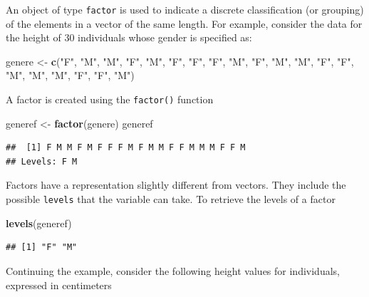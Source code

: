 \documentclass[
]{article}
\newenvironment{Shaded}{\begin{snugshade}}{\end{snugshade}}
\newcommand{\FunctionTok}[1]{\textcolor[rgb]{0.13,0.29,0.53}{\textbf{#1}}}
\newcommand{\NormalTok}[1]{#1}
\newcommand{\OtherTok}[1]{\textcolor[rgb]{0.56,0.35,0.01}{#1}}
\newcommand{\StringTok}[1]{\textcolor[rgb]{0.31,0.60,0.02}{#1}}
\begin{document}
An object of type \texttt{factor} is used to indicate a discrete
classification (or grouping) of the elements in a vector of the same
length. For example, consider the data for the height of 30 individuals
whose gender is specified as:

\begin{Shaded}
\begin{Highlighting}[]
\NormalTok{genere }\OtherTok{\textless{}{-}} \FunctionTok{c}\NormalTok{(}\StringTok{"F"}\NormalTok{, }\StringTok{"M"}\NormalTok{, }\StringTok{"M"}\NormalTok{, }\StringTok{"F"}\NormalTok{, }\StringTok{"M"}\NormalTok{, }\StringTok{"F"}\NormalTok{, }\StringTok{"F"}\NormalTok{, }\StringTok{"F"}\NormalTok{, }\StringTok{"M"}\NormalTok{, }\StringTok{"F"}\NormalTok{, }
            \StringTok{"M"}\NormalTok{, }\StringTok{"M"}\NormalTok{, }\StringTok{"F"}\NormalTok{, }\StringTok{"F"}\NormalTok{, }\StringTok{"M"}\NormalTok{, }\StringTok{"M"}\NormalTok{, }\StringTok{"M"}\NormalTok{, }\StringTok{"F"}\NormalTok{, }\StringTok{"F"}\NormalTok{, }\StringTok{"M"}\NormalTok{)}
\end{Highlighting}
\end{Shaded}

A factor is created using the \texttt{factor()} function

\begin{Shaded}
\begin{Highlighting}[]
\NormalTok{generef }\OtherTok{\textless{}{-}} \FunctionTok{factor}\NormalTok{(genere)}
\NormalTok{generef}
\end{Highlighting}
\end{Shaded}

\begin{verbatim}
##  [1] F M M F M F F F M F M M F F M M M F F M
## Levels: F M
\end{verbatim}

Factors have a representation slightly different from vectors. They
include the possible \texttt{levels} that the variable can take. To
retrieve the levels of a factor

\begin{Shaded}
\begin{Highlighting}[]
\FunctionTok{levels}\NormalTok{(generef)}
\end{Highlighting}
\end{Shaded}

\begin{verbatim}
## [1] "F" "M"
\end{verbatim}

Continuing the example, consider the following height values for
individuals, expressed in centimeters
\end{document}
